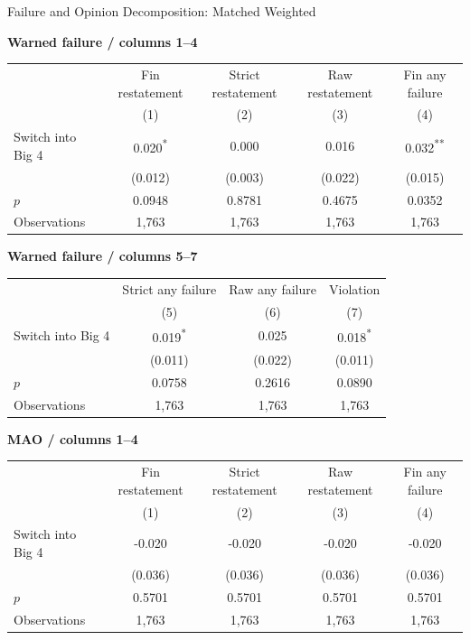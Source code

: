 \documentclass[10pt]{article}
\newcommand{\sym}[1]{\textsuperscript{#1}}
\begin{document}
\fontsize{10}{12}\selectfont
\setlength{\tabcolsep}{3pt}\renewcommand{\arraystretch}{1.15}
\begin{center}\large Failure and Opinion Decomposition: Matched Weighted\end{center}
\medskip\textbf{Warned failure / columns 1--4}\par\smallskip
\begin{tabular*}{\textwidth}{@{\extracolsep{\fill}}lcccc@{}}
\toprule
 & Fin restatement & Strict restatement & Raw restatement & Fin any failure \\
 & (1) & (2) & (3) & (4) \\
\midrule
Switch into Big 4 & 0.020\sym{*} & 0.000 & 0.016 & 0.032\sym{**} \\
 & (0.012) & (0.003) & (0.022) & (0.015) \\
$p$ & 0.0948 & 0.8781 & 0.4675 & 0.0352 \\
Observations & 1,763 & 1,763 & 1,763 & 1,763 \\
\bottomrule\end{tabular*}\par
\medskip\textbf{Warned failure / columns 5--7}\par\smallskip
\begin{tabular*}{\textwidth}{@{\extracolsep{\fill}}lccc@{}}
\toprule
 & Strict any failure & Raw any failure & Violation \\
 & (5) & (6) & (7) \\
\midrule
Switch into Big 4 & 0.019\sym{*} & 0.025 & 0.018\sym{*} \\
 & (0.011) & (0.022) & (0.011) \\
$p$ & 0.0758 & 0.2616 & 0.0890 \\
Observations & 1,763 & 1,763 & 1,763 \\
\bottomrule\end{tabular*}\par
\medskip\textbf{MAO / columns 1--4}\par\smallskip
\begin{tabular*}{\textwidth}{@{\extracolsep{\fill}}lcccc@{}}
\toprule
 & Fin restatement & Strict restatement & Raw restatement & Fin any failure \\
 & (1) & (2) & (3) & (4) \\
\midrule
Switch into Big 4 & -0.020 & -0.020 & -0.020 & -0.020 \\
 & (0.036) & (0.036) & (0.036) & (0.036) \\
$p$ & 0.5701 & 0.5701 & 0.5701 & 0.5701 \\
Observations & 1,763 & 1,763 & 1,763 & 1,763 \\
\bottomrule\end{tabular*}\par
\end{document}
